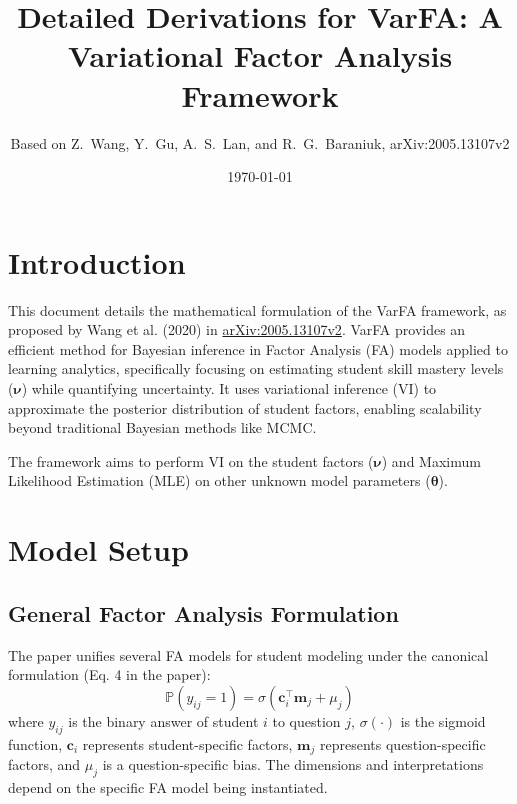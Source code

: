 \documentclass[11pt, letterpaper]{article}
\newcommand{\vnu}{\boldsymbol{\nu}} %
\newcommand{\vtheta}{\boldsymbol{\theta}} %
\newcommand{\vc}{\boldsymbol{c}} %
\newcommand{\vm}{\boldsymbol{m}} %
\newcommand{\sigm}{\sigma} %
\newcommand{\yij}{y_{ij}} %
\begin{document}
\title{Detailed Derivations for VarFA: A Variational Factor Analysis Framework}
\author{Based on Z.\ Wang, Y.\ Gu, A.\ S.\ Lan, and R.\ G.\ Baraniuk, arXiv:2005.13107v2}
\date{\today}
\maketitle

\section{Introduction}

This document details the mathematical formulation of the VarFA framework, as proposed by Wang et al. (2020) in \href{https://arxiv.org/abs/2005.13107}{arXiv:2005.13107v2}. VarFA provides an efficient method for Bayesian inference in Factor Analysis (FA) models applied to learning analytics, specifically focusing on estimating student skill mastery levels ($\vnu$) while quantifying uncertainty. It uses variational inference (VI) to approximate the posterior distribution of student factors, enabling scalability beyond traditional Bayesian methods like MCMC.

The framework aims to perform VI on the student factors ($\vnu$) and Maximum Likelihood Estimation (MLE) on other unknown model parameters ($\vtheta$).

\section{Model Setup}

\subsection{General Factor Analysis Formulation}
The paper unifies several FA models for student modeling under the canonical formulation (Eq. 4 in the paper):
\begin{equation}
    \mathbb{P}(\yij=1) = \sigm(\vc_i^{\top}\vm_j + \mu_j)
    \label{eq:fa_canonical}
\end{equation}
where $\yij$ is the binary answer of student $i$ to question $j$, $\sigm(\cdot)$ is the sigmoid function, $\vc_i$ represents student-specific factors, $\vm_j$ represents question-specific factors, and $\mu_j$ is a question-specific bias. The dimensions and interpretations depend on the specific FA model being instantiated.
\end{document}
